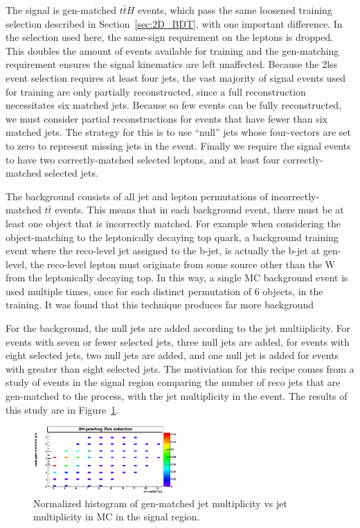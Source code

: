 The signal is gen-matched $t\bar{t}H$ events, which pass the same loosened training selection
described in Section~\ref{sec:2D_BDT}, with one important difference. In the selection used
here, the same-sign requirement on the leptons is dropped. This doubles the amount of events available
for training and the gen-matching requirement ensures the signal kinematics are left unaffected. 
Because the 2lss event selection requires at least four jets, the vast majority of signal
events used for training are only partially reconstructed, since a full reconstruction
necessitates six matched jets. Because so few events can be fully reconstructed, we must
consider partial reconstructions for events that have fewer than six matched jets.
The strategy for this is to use ``null'' jets whose four-vectors are set to zero to
represent missing jets in the event. Finally we require the signal events to have two
correctly-matched selected leptons, and at least four correctly-matched selected jets.

The background consists of all jet and lepton permutations of incorrectly-matched
$t\bar{t}$ events. This means that in each background event, there must be at least one
object that is incorrectly matched. For example when considering the object-matching to the
leptonically decaying top quark, a background training event where the reco-level jet assigned
to the b-jet, is actually the b-jet at gen-level, the reco-level lepton must originate from some source
other than the W from the leptonically decaying top. In this way, a single \ttbar MC
background event is used multiple times, once for each distinct permutation of 6 objects, in the training.
It was found that this technique produces far more background 


For the background, the null jets are added according to the
jet multiiplicity. For events with seven or fewer selected jets, three null jets are
added, for events with eight selected jets, two null jets are added, and one null jet
is added for events with greater than eight selected jets. The motiviation for this recipe
comes from a study of \tth events in the signal region comparing the number of reco jets that are
gen-matched to the \tth process, with the jet multiplicity in the event. The results of this study are
in Figure~\ref{fig:jet_matching}. 

\begin{figure}[htp]
\centering
\includegraphics[width=0.49\textwidth]{ch9_figs/jet_matching.png}
\caption[Comparison of gen-matched jet multiplicity to jet multiplicity in signal events]{ Normalized histogram of gen-matched jet multiplicity vs jet multiplicity in \tth MC in the signal region.}
\label{fig:jet_matching}
\end{figure}

